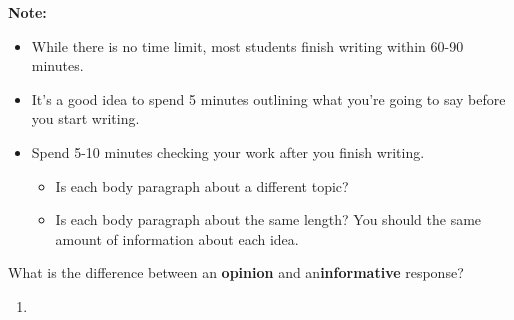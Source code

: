 \documentclass[12pt]{article}
\begin{document}
\begin{tcolorbox}[colframe=black!40, colback=gray!5, 
coltitle=black, colbacktitle=black!20, fonttitle=\bfseries\Large, 
title=Additional Notes, halign title=center, left=5pt, right=5pt, top=5pt, bottom=15pt]
\textbf{Note:}
\begin{itemize}

    \item While there is no time limit, most students finish writing within 60-90 minutes. 
    \item It's a good idea to spend 5 minutes outlining what you're going to say before you start writing.
    \item Spend 5-10 minutes checking your work after you finish writing. 
    \begin{itemize}
        \item Is each body paragraph about a different topic?

        \item Is each body paragraph about the same length? You should the same amount of information about each idea.
    \end{itemize}



\end{itemize}
\end{tcolorbox}

\vspace{1em}

\begin{tcolorbox}[colframe=black!60, colback=white, 
coltitle=black, colbacktitle=black!15, fonttitle=\bfseries\Large, 
title=Exit Ticket, halign title=center, left=10pt, right=10pt, top=10pt, bottom=15pt]
What is the difference between an \textbf{opinion} and an\textbf{informative} response?
\vspace{3em}
\begin{enumerate}[itemsep=4em] %

\item \underline{\hspace{14.3cm}}  
    \\[0.8cm] \underline{\hspace{14.3cm}}  
    \\[0.8cm] \underline{\hspace{14.3cm}} 
\\[0.8cm] \underline{\hspace{14.3cm}}  
    \\[0.8cm] \underline{\hspace{14.3cm}}  
    \\[0.8cm] \underline{\hspace{14.3cm}} 
\end{enumerate}
\end{tcolorbox}
\end{document}
